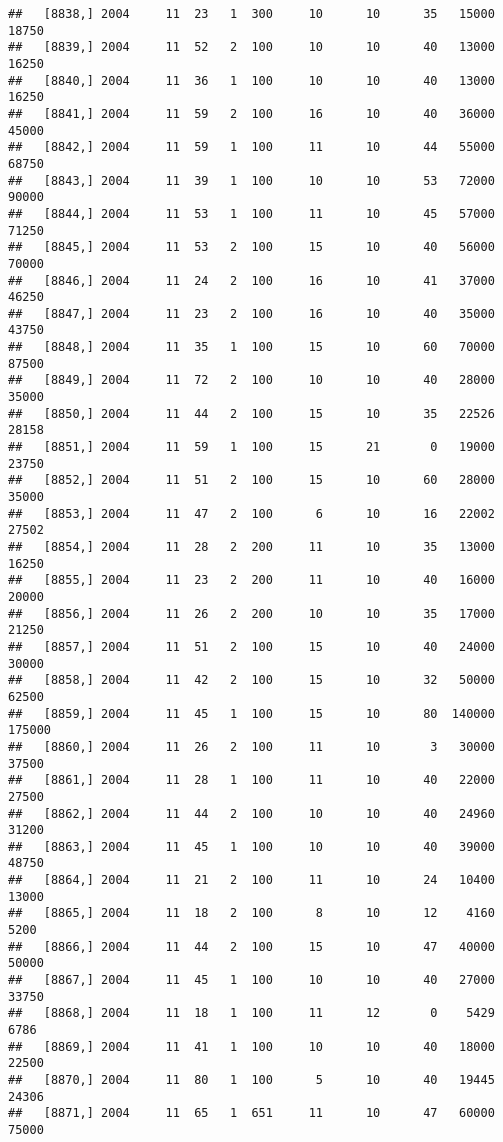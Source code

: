 \documentclass{article}\usepackage[]{graphicx}\usepackage[]{color}
\makeatletter
\newenvironment{kframe}{%
 \def\at@end@of@kframe{}%
 \ifinner\ifhmode%
  \def\at@end@of@kframe{\end{minipage}}%
  \begin{minipage}{\columnwidth}%
 \fi\fi%
 \def\FrameCommand##1{\hskip\@totalleftmargin \hskip-\fboxsep
 \colorbox{shadecolor}{##1}\hskip-\fboxsep
     \hskip-\linewidth \hskip-\@totalleftmargin \hskip\columnwidth}%
 \MakeFramed {\advance\hsize-\width
   \@totalleftmargin\z@ \linewidth\hsize
   \@setminipage}}%
 {\par\unskip\endMakeFramed%
 \at@end@of@kframe}
\newenvironment{knitrout}{}{} %
\makeatother
\begin{document}
\begin{knitrout}
\begin{kframe}
\begin{verbatim}
##   [8838,] 2004     11  23   1  300     10      10      35   15000   18750
##   [8839,] 2004     11  52   2  100     10      10      40   13000   16250
##   [8840,] 2004     11  36   1  100     10      10      40   13000   16250
##   [8841,] 2004     11  59   2  100     16      10      40   36000   45000
##   [8842,] 2004     11  59   1  100     11      10      44   55000   68750
##   [8843,] 2004     11  39   1  100     10      10      53   72000   90000
##   [8844,] 2004     11  53   1  100     11      10      45   57000   71250
##   [8845,] 2004     11  53   2  100     15      10      40   56000   70000
##   [8846,] 2004     11  24   2  100     16      10      41   37000   46250
##   [8847,] 2004     11  23   2  100     16      10      40   35000   43750
##   [8848,] 2004     11  35   1  100     15      10      60   70000   87500
##   [8849,] 2004     11  72   2  100     10      10      40   28000   35000
##   [8850,] 2004     11  44   2  100     15      10      35   22526   28158
##   [8851,] 2004     11  59   1  100     15      21       0   19000   23750
##   [8852,] 2004     11  51   2  100     15      10      60   28000   35000
##   [8853,] 2004     11  47   2  100      6      10      16   22002   27502
##   [8854,] 2004     11  28   2  200     11      10      35   13000   16250
##   [8855,] 2004     11  23   2  200     11      10      40   16000   20000
##   [8856,] 2004     11  26   2  200     10      10      35   17000   21250
##   [8857,] 2004     11  51   2  100     15      10      40   24000   30000
##   [8858,] 2004     11  42   2  100     15      10      32   50000   62500
##   [8859,] 2004     11  45   1  100     15      10      80  140000  175000
##   [8860,] 2004     11  26   2  100     11      10       3   30000   37500
##   [8861,] 2004     11  28   1  100     11      10      40   22000   27500
##   [8862,] 2004     11  44   2  100     10      10      40   24960   31200
##   [8863,] 2004     11  45   1  100     10      10      40   39000   48750
##   [8864,] 2004     11  21   2  100     11      10      24   10400   13000
##   [8865,] 2004     11  18   2  100      8      10      12    4160    5200
##   [8866,] 2004     11  44   2  100     15      10      47   40000   50000
##   [8867,] 2004     11  45   1  100     10      10      40   27000   33750
##   [8868,] 2004     11  18   1  100     11      12       0    5429    6786
##   [8869,] 2004     11  41   1  100     10      10      40   18000   22500
##   [8870,] 2004     11  80   1  100      5      10      40   19445   24306
##   [8871,] 2004     11  65   1  651     11      10      47   60000   75000

\end{verbatim}
\end{kframe}
\end{knitrout}
\end{document}

